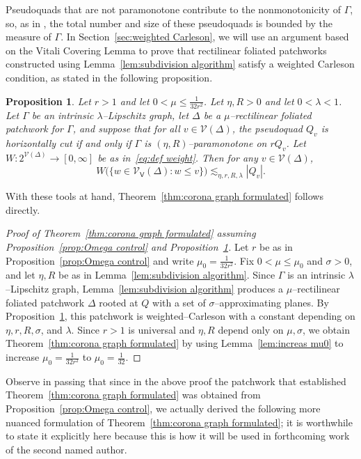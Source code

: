 \documentclass[11pt,reqno]{amsart}
\newcommand{\cV}{\mathcal{V}}
\newcommand{\0}{\mathbf{0}}
\renewcommand{\1}{\mathbf 1}
\newcommand{\from}{\colon}
\renewcommand{\mid}{:}
\renewcommand{\le}{\leqslant}
\newtheorem{prop}[thm]{Proposition}
\theoremstyle{remark}
\newcommand{\cVv}{{\mathcal{V}_{\mathsf{V}}}}
\begin{document}
Pseudoquads that are not paramonotone contribute to the nonmonotonicity of $\Gamma$, so, as in \cite{NY18}, the total number and size of these pseudoquads is bounded by the measure of $\Gamma$.  In Section~\ref{sec:weighted Carleson}, we will use an argument based on the Vitali Covering Lemma to prove that rectilinear foliated patchworks constructed using Lemma~\ref{lem:subdivision algorithm} satisfy a weighted Carleson condition, as stated in the following proposition.
\begin{prop}\label{prop:algorithm is weighted Carleson}
  Let $r>1$ and let $0<\mu\le \frac{1}{32r^2}$.  Let $\eta, R>0$ and let $0<\lambda<1$.  Let $\Gamma$ be an intrinsic $\lambda$--Lipschitz graph, let $\Delta$ be a $\mu$--rectilinear foliated patchwork for $\Gamma$, and suppose that for all $v\in \cV(\Delta)$, the pseudoquad $Q_v$ is horizontally cut if and only if $\Gamma$ is $(\eta,R)$--paramonotone on $rQ_v$.  Let $W\from 2^{\cV(\Delta)}\to [0,\infty]$ be as in~\eqref{eq:def weight}.  Then for any $v\in \cV(\Delta)$,
  \begin{equation}\label{eq:weight bounded by perim}
    W\big(\{w\in \cVv(\Delta)\mid w\le v\}\big)  \lesssim_{\eta, r, R, \lambda} |Q_v|.
  \end{equation}
\end{prop}

With these tools at hand, Theorem~\ref{thm:corona graph formulated} follows directly.
\begin{proof}[{Proof of Theorem~\ref{thm:corona graph formulated} assuming Proposition~\ref{prop:Omega control} and Proposition~\ref{prop:algorithm is weighted Carleson}}]
  Let $r$ be as in Proposition~\ref{prop:Omega control} and write $\mu_0=\frac{1}{32r^2}$.  Fix $0<\mu\le \mu_0$ and $\sigma>0$, and let $\eta, R$ be as in Lemma~\ref{lem:subdivision algorithm}.  Since $\Gamma$ is an intrinsic $\lambda$--Lipschitz graph, Lemma~\ref{lem:subdivision algorithm} produces a $\mu$--rectilinear foliated patchwork $\Delta$ rooted at $Q$ with a set of $\sigma$--approximating planes.  By Proposition~\ref{prop:algorithm is weighted Carleson}, this patchwork is weighted--Carleson with a constant depending on $\eta, r, R,\sigma$, and $\lambda$.  Since $r>1$ is universal and $\eta,R$ depend only on $\mu,\sigma$, we obtain Theorem~\ref{thm:corona graph formulated} by using Lemma~\ref{lem:increas mu0} to increase $\mu_0=\frac{1}{32r^2}$ to $\mu_0=\frac{1}{32}$.
\end{proof}


Observe in passing that since in the above proof the patchwork that established Theorem~\ref{thm:corona graph formulated} was obtained from Proposition~\ref{prop:Omega control}, we actually derived the following more nuanced formulation of Theorem~\ref{thm:corona graph formulated}; it is worthwhile to state it explicitly here because this is how it will be used in forthcoming work of the second named author.
\end{document}
